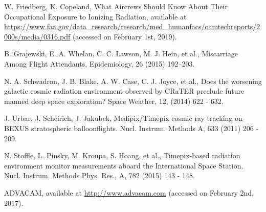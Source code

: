 



\begin{thebibliography}{00}

  W. Friedberg, K. Copeland, What Aircrews Should Know About Their Occupational Exposure to Ionizing Radiation, available at \url{https://www.faa.gov/data_research/research/med_humanfacs/oamtechreports/2000s/media/0316.pdf} (accessed on February 1st, 2019).
  
  B. Grajewski, E. A. Whelan, C. C. Lawson, M. J. Hein, et al., Miscarriage Among Flight Attendants, Epidemiology, 26 (2015) 192–203.

  N. A. Schwadron, J. B. Blake, A. W. Case, C. J. Joyce, et al., Does the worsening galactic cosmic radiation environment observed by CRaTER preclude future manned deep space exploration? Space Weather, 12, (2014) 622 - 632.

  J. Urbar, J. Scheirich, J. Jakubek, Medipix/Timepix cosmic ray tracking on BEXUS stratospheric balloonflights. Nucl. Instrum. Methods A, 633 (2011) 206 - 209.

 N. Stoffle, L. Pinsky, M. Kroupa, S. Hoang, et al., Timepix-based radiation environment monitor measurements aboard the International Space Station. Nucl. Instrum. Methods Phys. Res., A, 782 (2015) 143 - 148.

  ADVACAM, available at \url{http://www.advacam.com} (accessed on February 2nd, 2017).
  

\end{thebibliography}
